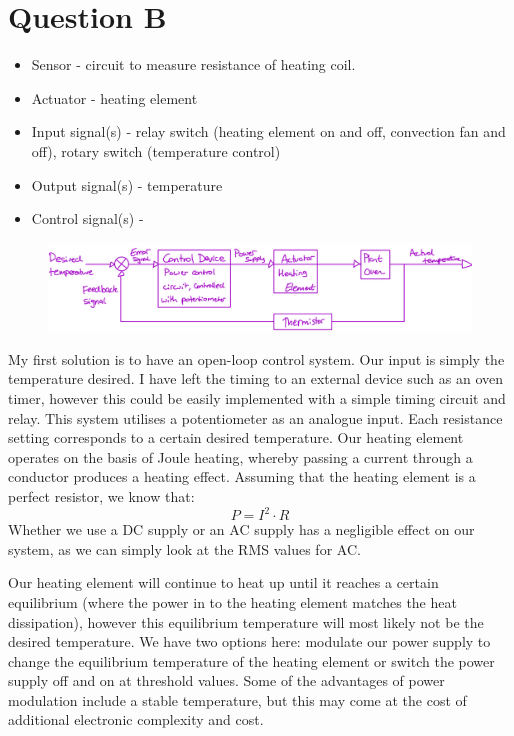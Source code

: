 \documentclass[12pt]{article}
\numberwithin{equation}{section}
\begin{document}
\section{Question B}
\begin{itemize}
  \item Sensor - circuit to measure resistance of heating coil.
  \item Actuator - heating element
  \item Input signal(s) - relay switch (heating element on and off, convection fan and off), rotary switch (temperature control)
  \item Output signal(s) - temperature
  \item Control signal(s) - 
\end{itemize}
\begin{figure}[H]
  \centering
  \includegraphics[width=\textwidth]{./img/2-1blockdiagram.png}
\end{figure}
My first solution is to have an open-loop control system. Our input is simply the temperature desired. I have left the timing to an external device such as an oven timer, however this could be easily implemented with a simple timing circuit and relay. This system utilises a potentiometer as an analogue input. Each resistance setting corresponds to a certain desired temperature. Our heating element operates on the basis of Joule heating, whereby passing a current through a conductor produces a heating effect. Assuming that the heating element is a perfect resistor, we know that:
\begin{equation}
  P = I^2 \cdot R
\end{equation}
Whether we use a DC supply or an AC supply has a negligible effect on our system, as we can simply look at the RMS values for AC. 

Our heating element will continue to heat up until it reaches a certain equilibrium (where the power in to the heating element matches the heat dissipation), however this equilibrium temperature will most likely not be the desired temperature. We have two options here: modulate our power supply to change the equilibrium temperature of the heating element or switch the power supply off and on at threshold values. Some of the advantages of power modulation include a stable temperature, but this may come at the cost of additional electronic complexity and cost. 
\end{document}
